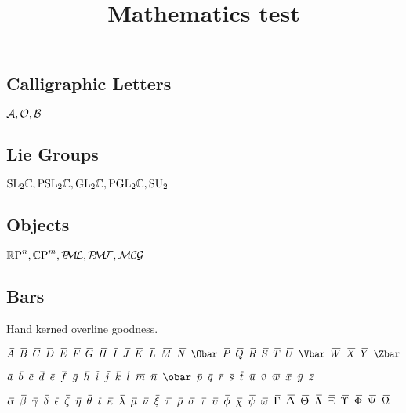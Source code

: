 \documentclass[noaddress, tikz]{nmd/article}
\title{Mathematics test}
\begin{document}
\maketitle

\subsection*{Calligraphic Letters}  ${\mathcal A}, {\mathcal O}, {\mathcal B}$

\subsection*{Lie Groups}  $\mathrm{ SL}_{2} {\mathbb C}, \mathrm{PSL}_{2} {\mathbb C}, \mathrm{GL}_{2} {\mathbb C},
\mathrm{PGL}_{2} {\mathbb C}, \mathrm{SU}_2$

\subsection*{Objects} $\RP^n, \CP^m, \PML, \PMF, \MCG$

\subsection*{Bars} Hand kerned overline goodness.  

$\Abar \enskip \Bbar \enskip \Cbar \enskip \Dbar
\enskip \Ebar \enskip \Fbar \enskip \Gbar \enskip \Hbar \enskip \Ibar
\enskip \Jbar \enskip \Kbar \enskip \Lbar \enskip \Mbar \enskip \Nbar
\enskip \Obar \enskip \Pbar \enskip \Qbar \enskip \Rbar \enskip \Sbar
\enskip \Tbar \enskip \Ubar \enskip \Vbar \enskip \Wbar \enskip \Xbar
\enskip \Ybar \enskip \Zbar$

$\abar \enskip \bbar \enskip \cbar \enskip \dbar \enskip \ebar \enskip
\fbar \enskip \gbar \enskip \hhbar \enskip \ibar \enskip \jbar \enskip \kbar
\enskip \lbar \enskip \mbar \enskip \nbar \enskip \obar \enskip \pbar
\enskip \qbar \enskip \rbar \enskip \sbar \enskip \tbar \enskip \ubar
\enskip \vbar \enskip \wbar \enskip \xbar \enskip \ybar \enskip \zbar$

$\alphabar \enskip \betabar \enskip \gammabar \enskip \deltabar \enskip \epsilonbar \enskip \zetabar \enskip \etabar \enskip \thetabar \enskip \iotabar \enskip \kappabar \enskip \lambdabar \enskip \mubar \enskip \nubar \enskip \xibar \enskip \pibar \enskip \rhobar \enskip \sigmabar \enskip \taubar \enskip \upsilonbar \enskip \phibar \enskip \chibar \enskip \psibar \enskip \omegabar \enskip \Gammabar \enskip \Deltabar \enskip \Thetabar \enskip \Lambdabar \enskip \Xibar \enskip \Upsilonbar \enskip \Phibar \enskip \Psibar \enskip \Omegabar$
\end{document}

